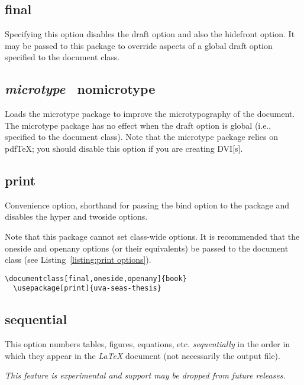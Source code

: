 \documentclass[10pt]{article}
\newcommand{\package}[1]{#1}
\newcommand{\option}[1]{#1}
\newcommand{\default}[1]{\emph{#1}}
\begin{document}
\subsection{\option{final}}
Specifying this option disables the \option{draft} option and also the \option{hidefront} option.
It may be passed to this package to override aspects of a global \option{draft} option specified to the document class.

\subsection{\default{\option{microtype}} \textbar\ \option{nomicrotype}}
Loads the \package{microtype} package to improve the microtypography of the document.
The \package{microtype} package has no effect when the \option{draft} option is global (i.e., specified to the document class).
Note that the \package{microtype} package relies on pdf\TeX; you should disable this option if you are creating \gls{DVI}[s].

\subsection{\option{print}}
Convenience option, shorthand for passing the \option{bind} option to the package and disables the \option{hyper} and \option{twoside} options.

Note that this package cannot set class-wide options.
It is recommended that the \option{oneside} and \option{openany} options (or their equivalents) be passed to the document class (see Listing~\ref{listing:print options}).

\begin{lstlisting}[gobble=2,float=h,caption={
    Example of options that are recommend for creating a print version.
  },label={listing:print options}]
  \documentclass[final,oneside,openany]{book}
  \usepackage[print]{uva-seas-thesis}
\end{lstlisting}

\subsection{\option{sequential}}
This option numbers tables, figures, equations, etc. \emph{sequentially} in the order in which they appear in the \emph{\LaTeX} document (not necessarily the output file).

\emph{This feature is experimental and support may be dropped from future releases.}
\end{document}
